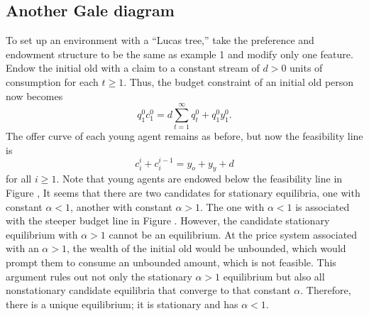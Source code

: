 \subsection{Another Gale diagram}\label{sec:olg_lucas_tree}%
To set up an environment with a ``Lucas tree,'' take the preference and endowment
structure to be the same as example 1 and modify only one feature.
Endow the initial old with a claim
to a constant stream of $d >0$ units of consumption for each
$t\geq 1$.
%
%
   Thus, the budget constraint of an initial old person now becomes
$$ q_1^0 c_1^0 = d \sum_{t=1}^\infty q_t^0 + q_1^0 y_1^0. $$
The offer curve of each young agent remains as before,
but now the feasibility line is
$$ c_i^i + c^{i-1}_i =  y_o + y_y + d $$
for all $i \geq 1$.  Note that young agents are  endowed
below the feasibility line in  Figure , %
It seems that there
are  two candidates for stationary equilibria, one
with constant  $\alpha < 1$, another with constant $\alpha >1$.
The one with $\alpha  <1$ is associated with the
steeper budget line in Figure . %
 However, the candidate stationary
equilibrium with $ \alpha >1 $ cannot be an equilibrium. %
 At the price
system associated with an $\alpha >1$, the wealth of the initial
old would be unbounded, which would prompt them to consume an
unbounded amount, which is not feasible.
This argument rules out not only the stationary $\alpha >1$ equilibrium
but also all nonstationary candidate equilibria that converge to
that constant $\alpha$.  Therefore, there is a unique equilibrium;
it is stationary and has $\alpha < 1$.


